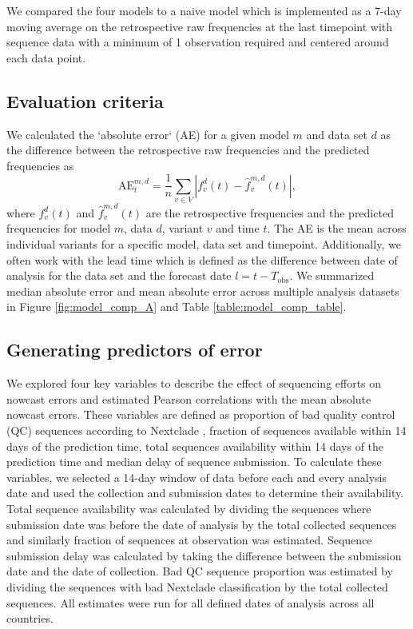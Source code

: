 \documentclass[11pt,oneside,letterpaper]{article}
\begin{document}
We compared the four models to a naive model which is implemented as a 7-day moving average on the retrospective raw frequencies at the last timepoint with sequence data with a minimum of 1 observation required and centered around each data point.

\subsection*{Evaluation criteria}

We calculated the `absolute error` (AE) for a given model $m$ and data set $d$ as the difference between the retrospective raw frequencies and the predicted frequencies as
\begin{equation}
    \mathrm{AE}_{t}^{m,d} = \frac{1}{n} \sum_{v \in V} \left|f_{v}^{d}(t) - \hat{f}^{m,d}_{v}(t) \right|,
\end{equation}
where $f_{v}^{d}(t)$ and $\hat{f}_{v}^{m,d}(t)$ are the retrospective frequencies and the predicted frequencies for model $m$, data $d$, variant $v$ and time $t$.
The AE is the mean across individual variants for a specific model, data set and timepoint.
Additionally, we often work with the lead time which is defined as the difference between date of analysis for the data set and the forecast date $l = t - T_{\text{obs}}$.
We summarized median absolute error and mean absolute error across multiple analysis datasets in Figure \ref{fig:model_comp_A} and Table \ref{table:model_comp_table}.

\subsection*{Generating predictors of error}

We explored four key variables to describe the effect of sequencing efforts on nowcast errors and estimated Pearson correlations with the mean absolute nowcast errors.
These variables are defined as proportion of bad quality control (QC) sequences according to Nextclade \cite{aksamentov2021nextclade}, fraction of sequences available within 14 days of the prediction time, total sequences availability within 14 days of the prediction time and median delay of sequence submission.
To calculate these variables, we selected a 14-day window of data before each and every analysis date and used the collection and submission dates to determine their availability.
Total sequence availability was calculated by dividing the sequences where submission date was before the date of analysis by the total collected sequences and similarly fraction of sequences at observation was estimated.
Sequence submission delay was calculated by taking the difference between the submission date and the date of collection.
Bad QC sequence proportion was estimated by dividing the sequences with bad Nextclade classification by the total collected sequences.
All estimates were run for all defined dates of analysis across all countries.
\end{document}
